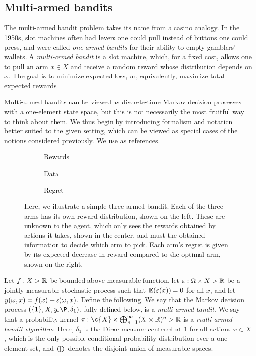 \documentclass[11pt]{book}
\begin{document}
\subsection{Multi-armed bandits}

The multi-armed bandit problem takes its name from a casino analogy.
In the 1950s, slot machines often had levers one could pull instead of buttons one could press, and were called \emph{one-armed bandits} for their ability to empty gamblers' wallets.
A \emph{multi-armed bandit} is a slot machine, which, for a fixed cost, allows one to pull an arm $x \in X$ and receive a random reward whose distribution depends on $x$.
The goal is to minimize  expected loss, or, equivalently, maximize total expected rewards.

Multi-armed bandits can be viewed as discrete-time Markov decision processes with a one-element state space, but this is not necessarily the most fruitful way to think about them.
We thus begin by introducing formalism and notation better suited to the given setting, which can be viewed as special cases of the notions considered previously.
We use \textcite{slivkins19,lattimore20} as references.

\begin{figure}
\begin{subfigure}{0.3\textwidth}

\caption{Rewards}
\end{subfigure}
\begin{subfigure}{0.3\textwidth}

\caption{Data}
\end{subfigure}
\begin{subfigure}{0.3\textwidth}

\caption{Regret}
\end{subfigure}
\caption{Here, we illustrate a simple three-armed bandit. Each of the three arms has its own reward distribution, shown on the left. These are unknown to the agent, which only sees the rewards obtained by actions it takes, shown in the center, and must the obtained information to decide which arm to pick. Each arm's regret is given by its expected decrease in reward compared to the optimal arm, shown on the right.}
\label{fig:mab}
\end{figure}

\begin{definition}
Let $f : X \-> \mathbb{R}$ be bounded above measurable function, let $\varepsilon : \Omega \times X \-> \mathbb{R}$ be a jointly measurable stochastic process such that $\operatorname{\mathbb{E}}(\varepsilon(x)) = 0$ for all $x$, and let $y(\omega,x) = f(x) + \varepsilon(\omega,x)$.
Define the following.
\1 We say that the Markov decision process $(\{1\},X,y_*\P,\delta_{1})$, fully defined below, is a \emph{multi-armed bandit}.
\2 We say that a probability kernel  $\pi : \c{X} \x \bigoplus_{n=1}^\infty (X \x \R)^n \-> \R$ is a \emph{multi-armed bandit algorithm}.
\0
Here, $\delta_1$ is the Dirac measure centered at $1$ for all actions $x\in X$, which is the only possible conditional probability distribution over a one-element set, and $\bigoplus$ denotes the disjoint union of measurable spaces.
\end{definition}
\end{document}

